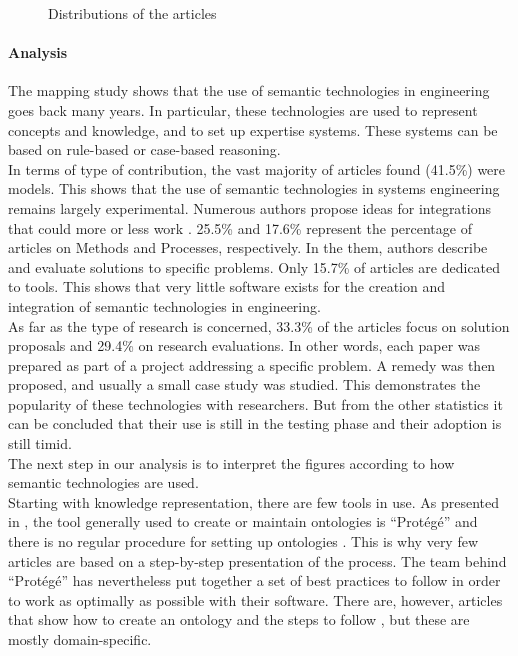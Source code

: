 \begin{figure}[h]
\begin{subfigure}[b]{0.45\textwidth}
                \end{subfigure}
                \caption{\label{fig:distro-art} Distributions of the articles}
            \end{figure}
            
            \paragraph{Analysis\label{para:sms_analysis}}
            The mapping study shows that the use of semantic technologies in engineering goes back many years. In particular, these technologies are used to represent concepts and knowledge, and to set up expertise systems. These systems can be based on rule-based or case-based reasoning.\\
            
            In terms of type of contribution, the vast majority of articles found (41.5\%) were models. This shows that the use of semantic technologies in systems engineering remains largely experimental. Numerous authors propose ideas for integrations that could more or less work \cite{benjamin2007using, tofani2010using, benjamin2006using, bouza2008semtree}. 25.5\% and 17.6\% represent the percentage of articles on Methods and Processes, respectively. In the them, authors describe and evaluate solutions to specific problems. Only 15.7\% of articles are dedicated to tools. This shows that very little software exists for the creation and integration of semantic technologies in engineering.\\
            As far as the type of research is concerned, 33.3\% of the articles focus on solution proposals and 29.4\% on research evaluations. In other words, each paper was prepared as part of a project addressing a specific problem. A remedy was then proposed, and usually a small case study was studied. This demonstrates the popularity of these technologies with researchers. But from the other statistics it can be concluded that their use is still in the testing phase and their adoption is still timid.\\

            The next step in our analysis is to interpret the figures according to how semantic technologies are used.\\
            Starting with knowledge representation, there are few tools in use. As presented in \cite{chen2012recommendation, abadi2018improving, liu2010ontology}, the tool generally used to create or maintain ontologies is “Protégé” and there is no regular procedure for setting up ontologies \cite{noy2001ontology}. This is why very few articles are based on a step-by-step presentation of the process. The team behind “Protégé” has nevertheless put together a set of best practices to follow \cite{noy2001ontology} in order to work as optimally as possible with their software. There are, however, articles that show how to create an ontology and the steps to follow \cite{sure2002methodology, li2018ontology}, but these are mostly domain-specific. \\

